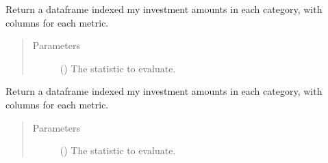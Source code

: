 \documentclass[letterpaper,10pt,english]{sphinxmanual}
\begin{document}
\begin{fulllineitems}
\begin{fulllineitems}
\begin{quote}
\begin{description}
\end{description}\end{quote}

\end{fulllineitems}


\begin{fulllineitems}
\label{\detokenize{doc-src/tyche:tyche.Evaluator.Evaluator.evaluate_corners_semilong}}
Return a dataframe indexed my investment amounts in each category,
with columns for each metric.
\begin{quote}\begin{description}
\item[{Parameters}] \leavevmode
{} () \textendash{} The statistic to evaluate.

\end{description}\end{quote}

\end{fulllineitems}


\begin{fulllineitems}
\label{\detokenize{doc-src/tyche:tyche.Evaluator.Evaluator.evaluate_corners_wide}}
Return a dataframe indexed my investment amounts in each category,
with columns for each metric.
\begin{quote}\begin{description}
\item[{Parameters}] \leavevmode
{} () \textendash{} The statistic to evaluate.

\end{description}\end{quote}

\end{fulllineitems}


\end{fulllineitems}
\end{document}
